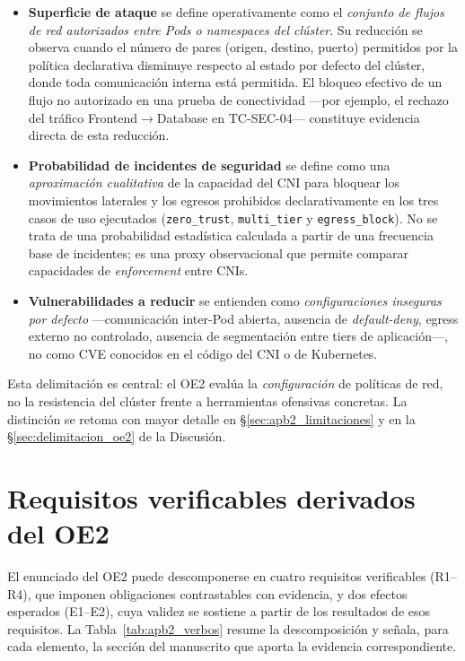 \begin{itemize}
    \item \textbf{Superficie de ataque} se define operativamente como el \emph{conjunto de flujos de red autorizados entre Pods o namespaces del clúster}. Su reducción se observa cuando el número de pares (origen, destino, puerto) permitidos por la política declarativa disminuye respecto al estado por defecto del clúster, donde toda comunicación interna está permitida. El bloqueo efectivo de un flujo no autorizado en una prueba de conectividad ---por ejemplo, el rechazo del tráfico Frontend$\rightarrow$Database en TC-SEC-04--- constituye evidencia directa de esta reducción.

    \item \textbf{Probabilidad de incidentes de seguridad} se define como una \emph{aproximación cualitativa} de la capacidad del CNI para bloquear los movimientos laterales y los egresos prohibidos declarativamente en los tres casos de uso ejecutados (\texttt{zero\_trust}, \texttt{multi\_tier} y \texttt{egress\_block}). No se trata de una probabilidad estadística calculada a partir de una frecuencia base de incidentes; es una proxy observacional que permite comparar capacidades de \emph{enforcement} entre CNIs.

    \item \textbf{Vulnerabilidades a reducir} se entienden como \emph{configuraciones inseguras por defecto} ---comunicación inter-Pod abierta, ausencia de \emph{default-deny}, egress externo no controlado, ausencia de segmentación entre tiers de aplicación---, no como CVE conocidos en el código del CNI o de Kubernetes.
\end{itemize}

Esta delimitación es central: el OE2 evalúa la \emph{configuración} de políticas de red, no la resistencia del clúster frente a herramientas ofensivas concretas. La distinción se retoma con mayor detalle en \S\ref{sec:apb2_limitaciones} y en la \S\ref{sec:delimitacion_oe2} de la Discusión.

\section{Requisitos verificables derivados del OE2} \label{sec:apb2_verbos}

El enunciado del OE2 puede descomponerse en cuatro requisitos verificables (R1--R4), que imponen obligaciones contrastables con evidencia, y dos efectos esperados (E1--E2), cuya validez se sostiene a partir de los resultados de esos requisitos. La Tabla~\ref{tab:apb2_verbos} resume la descomposición y señala, para cada elemento, la sección del manuscrito que aporta la evidencia correspondiente.

